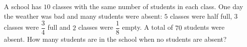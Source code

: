A school has $10$ classes with the same number of students in each class. One day the weather was bad and many students were absent: $5$ classes were half full, $3$ classes were $\dfrac34$ full and $2$ classes were $\dfrac18$ empty. A total of $70$ students were absent. How many students are in the school when no students are absent?
